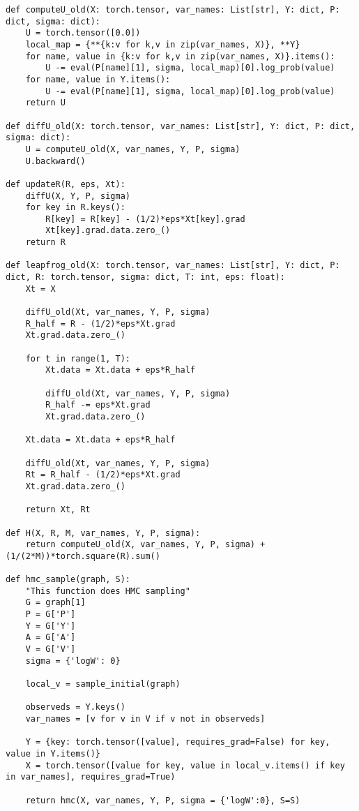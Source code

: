\documentclass[11pt]{article}
\begin{document}
{{\begin{verbatim}
def computeU_old(X: torch.tensor, var_names: List[str], Y: dict, P: dict, sigma: dict):
    U = torch.tensor([0.0])
    local_map = {**{k:v for k,v in zip(var_names, X)}, **Y}
    for name, value in {k:v for k,v in zip(var_names, X)}.items():
        U -= eval(P[name][1], sigma, local_map)[0].log_prob(value)
    for name, value in Y.items():
        U -= eval(P[name][1], sigma, local_map)[0].log_prob(value)
    return U

def diffU_old(X: torch.tensor, var_names: List[str], Y: dict, P: dict, sigma: dict):
    U = computeU_old(X, var_names, Y, P, sigma)
    U.backward()

def updateR(R, eps, Xt):
    diffU(X, Y, P, sigma)
    for key in R.keys():
        R[key] = R[key] - (1/2)*eps*Xt[key].grad
        Xt[key].grad.data.zero_()
    return R

def leapfrog_old(X: torch.tensor, var_names: List[str], Y: dict, P: dict, R: torch.tensor, sigma: dict, T: int, eps: float):
    Xt = X

    diffU_old(Xt, var_names, Y, P, sigma)
    R_half = R - (1/2)*eps*Xt.grad
    Xt.grad.data.zero_()

    for t in range(1, T):
        Xt.data = Xt.data + eps*R_half

        diffU_old(Xt, var_names, Y, P, sigma)
        R_half -= eps*Xt.grad
        Xt.grad.data.zero_()

    Xt.data = Xt.data + eps*R_half

    diffU_old(Xt, var_names, Y, P, sigma)
    Rt = R_half - (1/2)*eps*Xt.grad
    Xt.grad.data.zero_()

    return Xt, Rt

def H(X, R, M, var_names, Y, P, sigma):
    return computeU_old(X, var_names, Y, P, sigma) + (1/(2*M))*torch.square(R).sum()

def hmc_sample(graph, S):
    "This function does HMC sampling"
    G = graph[1]
    P = G['P']
    Y = G['Y']
    A = G['A']
    V = G['V']
    sigma = {'logW': 0}

    local_v = sample_initial(graph)

    observeds = Y.keys()
    var_names = [v for v in V if v not in observeds]

    Y = {key: torch.tensor([value], requires_grad=False) for key, value in Y.items()}
    X = torch.tensor([value for key, value in local_v.items() if key in var_names], requires_grad=True)

    return hmc(X, var_names, Y, P, sigma = {'logW':0}, S=S)


\end{verbatim}}}
\end{document}

